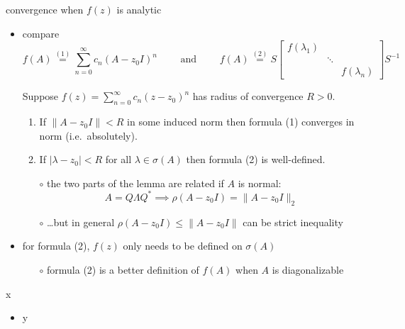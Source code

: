 \documentclass[10pt,hyperref]{beamer}
\begin{document}
\begin{frame}{convergence when $f(z)$ is analytic}

\begin{itemize}
\item compare
\small
   $$f(A) \stackrel{(1)}{=} \sum_{n=0}^\infty c_n (A-z_0 I)^n \qquad \text{ and } \qquad f(A) \stackrel{(2)}{=} S \begin{bmatrix} f(\lambda_1) & & \\ & \ddots & \\ & & f(\lambda_n) \end{bmatrix} S^{-1}$$
\normalsize
\begin{lemma}
Suppose $f(z) = \sum_{n=0}^\infty c_n (z-z_0)^n$ has radius of convergence $R>0$.
    \begin{enumerate}
    \item If $\|A-z_0 I\|<R$ in some induced norm then formula (1) converges in norm (i.e.~absolutely).
    \item If $|\lambda - z_0|<R$ for all $\lambda \in \sigma(A)$ then formula (2) is well-defined.
    \end{enumerate}
\end{lemma}
    \begin{itemize}
    \item[$\circ$] the two parts of the lemma are related if $A$ is normal:
    $$A = Q \Lambda Q^* \implies \rho(A-z_0 I) = \|A - z_0 I\|_2$$
    \item[$\circ$] \dots but in general $\rho(A-z_0 I) \le \|A-z_0 I\|$ can be strict inequality
    \end{itemize}
\item for formula (2), $f(z)$ only needs to be defined on $\sigma(A)$
    \begin{itemize}
    \item[$\circ$] formula (2) is a better definition of $f(A)$ when $A$ is diagonalizable
    \end{itemize}
\end{itemize}
\end{frame}


\begin{frame}{x}

\begin{itemize}
\item y
\end{itemize}
\end{frame}
\end{document}
